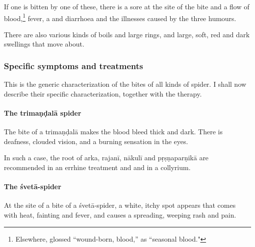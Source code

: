 \begin{translation}
If one is bitten by one of these, there is a sore at the site of the
bite and a flow of blood,\footnote{Elsewhere, 
    glossed  “wound-born, blood,” as 
    “seasonal blood."} fever, a  and diarrhoea and
    the illnesses caused by the three humours.
 
\item[99]
 There are also various kinds of boils and large rings, and large, soft, red and 
 dark swellings that move about.
 
\subsubsection{Specific symptoms and treatments}
 
 \item[100]
 
This is the generic characterization of the bites of all kinds of
spider.  I shall now describe their specific characterization,
together with the therapy. 


\paragraph{The \Gls{trimaṇḍalā} spider}

\item [101]

The bite of a \Gls{trimaṇḍalā} makes the blood bleed thick and dark. 
There is deafness, clouded vision, and a burning sensation in the
eyes.

\item[102]

In such a case, the root of \gls{arka}, \gls{rajanī}, \gls{nākulī} and 
\gls{pṛṣṇaparṇikā} are recommended in an errhine treatment and
 and in a collyrium. 


\paragraph{The \Gls{śvetā-spider}}

\item[103]

At the site of a bite of a \Gls{śvetā-spider}, a white, itchy spot
appears that comes with heat, fainting and fever, and causes  
a spreading, weeping rash and pain.

\item[104]


\end{translation}
